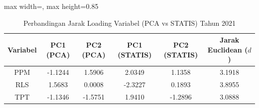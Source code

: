 \begin{table}[H]
\centering
\caption{Perbandingan Jarak Loading Variabel (PCA vs STATIS) Tahun 2021} \makeatletter{}\makeatother
\begin{adjustbox}{max width=\textwidth, max height=0.85\textheight}
\begin{tabular}{|c|c|c|c|c|c|}
\hline
\textbf{Variabel} & \textbf{PC1 (PCA)} & \textbf{PC2 (PCA)} & \textbf{PC1 (STATIS)} & \textbf{PC2 (STATIS)} & \textbf{Jarak Euclidean ($d$)} \\
\hline
PPM & -1.1244 & 1.5906 & 2.0349 & 1.1358 & 3.1918 \\
RLS & 1.5683 & 0.0008 & -2.3227 & 0.1893 & 3.8955 \\
TPT & -1.1346 & -1.5751 & 1.9410 & -1.2896 & 3.0888 \\
\hline
\end{tabular}
\end{adjustbox}
\end{table}